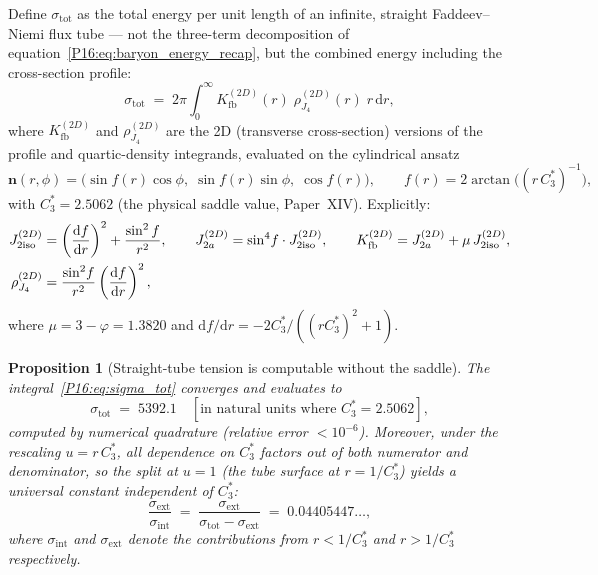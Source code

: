\documentclass[11pt,a4paper]{article}
\newtheorem{proposition}[theorem]{Proposition}
\theoremstyle{definition}\newtheorem{definition}[theorem]{Definition}
\theoremstyle{remark}
\theoremstyle{definition}\newtheorem{construction}[theorem]{Construction}
\newcommand{\vp}{\varphi}
\newcommand{\Kfb}{K_{\mathrm{fb}}}
\begin{document}
Define $\sigma_{\mathrm{tot}}$ as the total energy per unit length of
an infinite, straight Faddeev--Niemi flux tube --- not the three-term
decomposition of equation~\eqref{P16:eq:baryon_energy_recap}, but the
combined energy including the cross-section profile:
\begin{equation}
  \sigma_{\mathrm{tot}}
  \;=\; 2\pi\int_0^\infty
    \Kfb^{(2D)}(r)\;\rho_{J_4}^{(2D)}(r)\;r\,\mathrm{d}r,
  \label{P16:eq:sigma_tot}
\end{equation}
where $\Kfb^{(2D)}$ and $\rho_{J_4}^{(2D)}$ are the 2D (transverse
cross-section) versions of the profile and quartic-density integrands,
evaluated on the cylindrical ansatz
\begin{equation}
  \mathbf{n}(r,\phi)
  = \bigl(\sin f(r)\cos\phi,\;\sin f(r)\sin\phi,\;\cos f(r)\bigr),
  \qquad
  f(r) = 2\arctan\!\bigl((r\,C_3^*)^{-1}\bigr),
  \label{P16:eq:straight_tube_ansatz}
\end{equation}
with $C_3^*=2.5062$ (the physical saddle value, Paper~XIV).
Explicitly:
\begin{align}
  J_{2\mathrm{iso}}^{(2D)} &= \left(\frac{\mathrm{d}f}{\mathrm{d}r}\right)^2
    + \frac{\sin^2 f}{r^2},
  \qquad
  J_{2a}^{(2D)} = \sin^4\!f\cdot J_{2\mathrm{iso}}^{(2D)},
  \qquad
  \Kfb^{(2D)} = J_{2a}^{(2D)} + \mu\,J_{2\mathrm{iso}}^{(2D)},
  \notag\\
  \rho_{J_4}^{(2D)} &= \frac{\sin^2\!f}{r^2}
    \left(\frac{\mathrm{d}f}{\mathrm{d}r}\right)^2,
  \label{P16:eq:2D_integrands}
\end{align}
where $\mu=3-\vp=1.3820$ and $\mathrm{d}f/\mathrm{d}r=-2C_3^*/((rC_3^*)^2+1)$.

\begin{proposition}[Straight-tube tension is computable without the saddle]
\label{P16:prop:sigma_tot}
The integral~\eqref{P16:eq:sigma_tot} converges and evaluates to
\begin{equation}
  \sigma_{\mathrm{tot}} \;=\; 5392.1
  \quad [\text{in natural units where }C_3^*=2.5062],
  \label{P16:eq:sigma_tot_value}
\end{equation}
computed by numerical quadrature (relative error $<10^{-6}$).
Moreover, under the rescaling $u=r\,C_3^*$, all dependence on $C_3^*$
factors out of both numerator and denominator, so the split at
$u=1$ (the tube surface at $r=1/C_3^*$) yields a
\emph{universal constant} independent of $C_3^*$:
\begin{equation}
  \frac{\sigma_{\mathrm{ext}}}{\sigma_{\mathrm{int}}}
  \;=\; \frac{\sigma_{\mathrm{ext}}}{\sigma_{\mathrm{tot}}-\sigma_{\mathrm{ext}}}
  \;=\; 0.04405447\ldots,
  \label{P16:eq:sigma_split_ratio}
\end{equation}
where $\sigma_{\mathrm{int}}$ and $\sigma_{\mathrm{ext}}$ denote the
contributions from $r<1/C_3^*$ and $r>1/C_3^*$ respectively.
\end{proposition}
\end{document}

